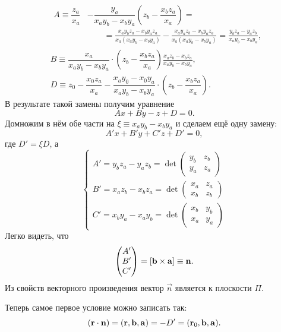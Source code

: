 \begin{align*}
&
\begin{aligned}
    A \equiv  \dfrac{z_a}{x_a} &- \dfrac{y_a}{x_a y_b - x_b y_a} \left( z_b - \dfrac{x_b z_a}{x_a} \right) = \\
    &\quad\quad= \frac{x_a y_b z_a - x_b y_a z_a}{x_a (x_a y_b - x_b y_a)} - \frac{x_a y_a z_b - x_b y_a z_a}{x_a (x_a y_b - x_b y_a)} = \frac{y_b z_a - y_a z_b}{x_a y_b - x_b y_a},
\end{aligned}\\
&
B \equiv \dfrac{x_a}{x_a y_b - x_b y_a} \cdot \left( z_b - \dfrac{x_b z_a}{x_a} \right) 
\frac{x_a z_b - x_b z_a}{x_a y_b - x_b y_a},\\
&
D \equiv z_0 - \dfrac{x_0 z_a}{x_a} - \dfrac{x_a y_0 - x_0 y_a}{x_a y_b - x_b y_a} \cdot \left( z_b - \dfrac{x_b z_a}{x_a} \right).
\end{align*}
В результате такой замены получим уравнение
\begin{equation}
Ax + By - z + D = 0.
\end{equation}
Домножим в нём обе части на $\xi \equiv x_a y_b - x_b y_a$ и сделаем ещё одну замену:
\begin{equation*}
A'x + B'y + C'z + D' = 0,
\end{equation*}
где $D' = \xi D$, а
\begin{equation*}
\begin{cases}
    A' = y_b z_a - y_a z_b = \det
    \begin{pmatrix}
        y_b & z_b\\
        y_a & z_a
    \end{pmatrix}\\[1pc]
    B' = x_a z_b - x_b z_a = \det
    \begin{pmatrix}
        x_a & z_a\\
        x_b & z_b
    \end{pmatrix}\\[1pc]
    C' = x_b y_a - x_a y_b = \det
    \begin{pmatrix}
        x_b & y_b\\
        x_a & y_a
    \end{pmatrix}
\end{cases}
\end{equation*}
Легко видеть, что
\begin{equation}
\begin{pmatrix}
    A'\\
    B'\\
    C'
\end{pmatrix} =
\left[\mathbf{b} \times \mathbf{a}\right] \equiv \mathbf{n}.
\end{equation}
Из свойств векторного произведения вектор $\vec n$ является  к плоскости $\Pi$.

Теперь  самое первое условие можно записать так:
\begin{equation}
\left(\mathbf{r} \cdot \mathbf{n}\right) = \left( \mathbf{r}, \mathbf{b}, \mathbf{a} \right) = -D' = (\mathbf{r}_0, \mathbf{b}, \mathbf{a}).
\end{equation}
